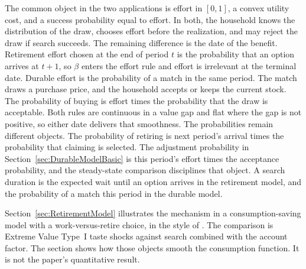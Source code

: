 The common object in the two applications is effort in $[0,1]$, a convex utility cost, and
a success probability equal to effort. In both, the household knows the distribution of the
draw, chooses effort before the realization, and may reject the draw if search succeeds.
The remaining difference is the date of the benefit. Retirement effort chosen at the end of
period $t$ is the probability that an option arrives at $t+1$, so $\beta$ enters the effort
rule and effort is irrelevant at the terminal date. Durable effort is the probability of a
match in the same period. The match draws a purchase price, and the household accepts
or keeps the current stock. The probability of buying is effort times the probability that
the draw is acceptable. Both rules are continuous in a value gap and flat where the gap
is not positive, so either date delivers that smoothness. The probabilities remain
different objects. The probability of retiring is next period's arrival times the probability
that claiming is selected. The adjustment probability in Section~\ref{sec:DurableModelBasic}
is this period's effort times the acceptance probability, and the steady-state comparison
disciplines that object. A search duration is the expected wait until an option arrives in
the retirement model, and the probability of a match this period in the durable model.

Section~\ref{sec:RetirementModel} illustrates the mechanism in a consumption-saving
model with a work-versus-retire choice, in the style of \citet{Iskhakov2017-jb}. The
comparison is Extreme Value Type~I taste shocks against search combined with the
account factor. The section shows how those objects smooth the consumption function.
It is not the paper's quantitative result.

